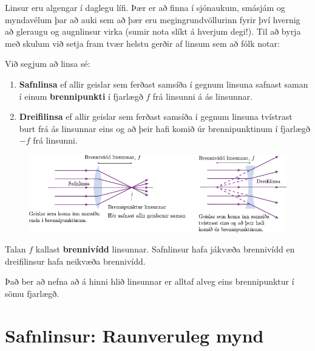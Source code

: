 \ifdefined \wholebook \else\documentclass[oneside]{book}\usepackage{EdlBook}\graphicspath{{figures/}}
\begin{document}
Linsur eru algengar í daglegu lífi. Þær er að finna í sjónaukum, smásjám og myndavélum þar að auki sem að þær eru megingrundvöllurinn fyrir því hvernig að gleraugu og augnlinsur virka (sumir nota slíkt á hverjum degi!). Til að byrja með skulum við setja fram tvær helstu gerðir af linsum sem að fólk notar:

\begin{tcolorbox}
\begin{definition} Við segjum að linsa sé:
\begin{enumerate}[label = \textbf{(\roman*)}]
    \item \textbf{Safnlinsa} ef allir geislar sem ferðast samsíða í gegnum linsuna safnast saman í einum \textbf{brennipunkti} í fjarlægð $f$ frá linsunni á ás linsunnar.
    \item \textbf{Dreifilinsa} ef allir geislar sem ferðast samsíða í gegnum linsuna tvístrast burt frá ás linsunnar eins og að þeir hafi komið úr brennipunktinum í fjarlægð $-f$ frá linsunni.
\end{enumerate}
\begin{figure}[H]
    \centering
    \includegraphics{figures/dreifi-safn.pdf}
\end{figure}
Talan $f$ kallast \textbf{brennivídd} linsunnar. Safnlinsur hafa jákvæða brennivídd en dreifilinsur hafa neikvæða brennivídd.
\end{definition}
\end{tcolorbox}

Það ber að nefna að á hinni hlið linsunnar er alltaf alveg eins brennipunktur í sömu fjarlægð.

\section{Safnlinsur: Raunveruleg mynd}
\end{document}
